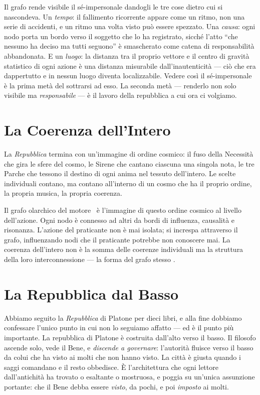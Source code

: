 Il grafo rende visibile il s\'e-impersonale dandogli le tre cose dietro cui si
nascondeva. Un \emph{tempo}: il fallimento ricorrente appare come un ritmo, non
una serie di accidenti, e un ritmo una volta visto pu\`o essere spezzato. Una
\emph{causa}: ogni nodo porta un bordo verso il soggetto che lo ha registrato,
sicch\'e l'atto ``che nessuno ha deciso ma tutti seguono'' \`e smascherato come
catena di responsabilit\`a abbandonata. E un \emph{luogo}: la distanza tra il
proprio vettore e il centro di gravit\`a statistico di ogni azione \`e una distanza
misurabile dall'inautenticit\`a --- ci\`o che era dappertutto e in nessun luogo
diventa localizzabile. Vedere cos\`i il s\'e-impersonale \`e la prima met\`a del
sottrarsi ad esso. La seconda met\`a --- renderlo non solo visibile ma
\emph{responsabile} --- \`e il lavoro della repubblica a cui ora ci volgiamo.

\section{La Coerenza dell'Intero}

La \emph{Repubblica} termina con un'immagine di ordine cosmico: il fuso
della Necessit\`a che gira le sfere del cosmo, le Sirene che cantano
ciascuna una singola nota, le tre Parche che tessono il destino di ogni
anima nel tessuto dell'intero. Le scelte individuali contano, ma contano
all'interno di un cosmo che ha il proprio ordine, la propria musica, la
propria coerenza.

Il grafo olarchico del motore \physis\ \`e l'immagine di questo ordine
cosmico al livello dell'azione. Ogni nodo \`e connesso ad altri da bordi
di influenza, causalit\`a e risonanza. L'azione del praticante non \`e
mai isolata; si increspa attraverso il grafo, influenzando nodi che il
praticante potrebbe non conoscere mai. La coerenza dell'intero non \`e
la somma delle coerenze individuali ma la struttura della loro
interconnessione --- la forma del grafo stesso
\parencite{koestler1967ghost}.

\section{La Repubblica dal Basso}

Abbiamo seguito la \emph{Repubblica} di Platone per dieci libri, e alla fine
dobbiamo confessare l'unico punto in cui non lo seguiamo affatto --- ed \`e il
punto pi\`u importante. La repubblica di Platone \`e costruita dall'alto verso il
basso. Il filosofo ascende solo, vede il Bene, e \emph{discende a governare}:
l'autorit\`a fluisce verso il basso da colui che ha visto ai molti che non hanno
visto. La citt\`a \`e giusta quando i saggi comandano e il resto obbedisce. \`E
l'architettura che ogni lettore dall'antichit\`a ha trovato o esaltante o
mostruosa, e poggia su un'unica assunzione portante: che il Bene debba essere
\emph{visto}, da pochi, e poi \emph{imposto} ai molti.

